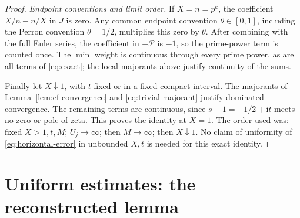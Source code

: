 \documentclass[11pt]{article}
\newcommand{\ii}{\mathrm i}
\newcommand{\PS}{\mathcal P}
\begin{document}
\begin{proof}
\textit{Endpoint conventions and limit order.}
If \(X=n=p^k\), the coefficient \(X/n-n/X\) in \(J\) is zero.
Any common endpoint convention \(\theta\in[0,1]\), including
the Perron convention \(\theta=1/2\), multiplies this zero by
\(\theta\). After combining with the full Euler series, the coefficient
in \(-\PS\) is \(-1\), so the prime-power term is counted once.
The \(\min\) weight is continuous through every prime power, as are
all terms of \eqref{eq:exact}; the local majorants above justify
continuity of the sums.

Finally let \(X\downarrow1\), with \(t\) fixed or in a fixed compact
interval. The majorants of Lemma~\ref{lem:ef-convergence} and
\eqref{eq:trivial-majorant} justify dominated convergence.
The remaining terms are continuous, since \(s-1=-1/2+\ii t\) meets
no zero or pole of zeta. This proves the identity at \(X=1\).
The order used was: fixed \(X>1,t,M\); \(U_j\to\infty\);
then \(M\to\infty\); then \(X\downarrow1\).
No claim of uniformity of \eqref{eq:horizontal-error} in unbounded
\(X,t\) is needed for this exact identity.
\end{proof}

\section{Uniform estimates: the reconstructed lemma}
\end{document}
